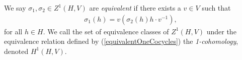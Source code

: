 

We say $\sigma_1, \sigma_2 \in Z^1(H, V)$ are \emph{equivalent} if there exists a $v \in V$ such that
\begin{eqnarray}\label{equivalentOneCocycles}
	\sigma_1(h) = v (\sigma_2(h) h \cdot v^{-1}),
\end{eqnarray}
for all $h \in H$. We call the set of equivalence classes of $Z^1(H, V)$ under the equivalence relation defined by (\ref{equivalentOneCocycles}) the \emph{1-cohomology}, denoted $H^1(H, V)$.

